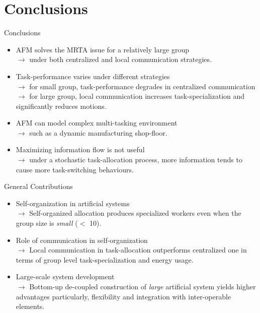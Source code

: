 \documentclass[handout,draft]{beamer}
\begin{document}
\section{Conclusions}
\begin{frame}[t]{Conclusions}
\begin{itemize}
    \item \normalsize \alert{AFM solves the MRTA issue for a relatively large group}\\
    $\rightarrow$ \small under both centralized and local communication strategies.
    \item \normalsize \alert{Task-performance varies under different strategies}\\
    $\rightarrow$ \small for small group, task-performance degrades in centralized communication\\
    $\rightarrow$ \small for large group, local  communication increases task-specialization and significantly reduces motions.    
    \item \normalsize \alert{AFM can model complex multi-tasking environment}\\
    $\rightarrow$ \small such as a dynamic manufacturing shop-floor.
    \item \normalsize \alert{Maximizing information flow is not useful}\\
    $\rightarrow$ \small  under a stochastic task-allocation process, more information tends to cause more task-switching behaviours. %
 \end{itemize}
\end{frame}
\begin{frame}[t]{General Contributions}
%
\begin{itemize}
    \item \normalsize \alert{Self-organization in artificial systems}\\ 
$\rightarrow$ \small Self-organized allocation produces specialized workers even when the group size is \textit{small} ($<$ 10).
    \item \normalsize \alert{Role of communication in self-organization}\\
$\rightarrow$ \small  Local communication in task-allocation outperforms centralized one in terms of group level task-specialization and energy usage.
\item \normalsize \alert{Large-scale system development}\\
$\rightarrow$ \small Bottom-up de-coupled construction of \textit{large} artificial system yields higher advantages particularly, flexibility and integration with inter-operable elements.%
\end{itemize}
%
\end{frame}
\end{document}
